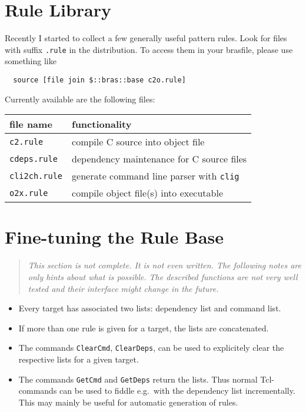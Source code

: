 \documentclass[12pt]{article}
\begin{document}
\section{Rule Library}

Recently I started to collect a few generally useful pattern
rules. Look for files with suffix \texttt{.rule} in the
distribution. To access them in your brasfile, please use something
like 
\begin{verbatim}
  source [file join $::bras::base c2o.rule]
\end{verbatim}
Currently available are the following files:
\begin{center}
\begin{tabular}{l|l}
file name & functionality\\\hline
\texttt{c2.rule} & compile C source into object file\\
\texttt{cdeps.rule} & dependency maintenance for C source files\\
\texttt{cli2ch.rule} & generate command line parser with
  \texttt{clig}\\
\texttt{o2x.rule} & compile object file(s) into executable\\
\end{tabular}
\end{center}

\section{Fine-tuning the Rule Base}
\begin{quote}\itshape
This section is not complete. It is not even written. The following
notes are only hints about what is possible. The described functions
are not very well tested and their interface might change in the
future.
\end{quote}

\begin{itemize}
\item
Every target has associated two lists: dependency list and command list.
\item
If more than one rule is given for a target, the lists are
concatenated. 
\item
The commands \texttt{ClearCmd}, \texttt{ClearDeps},
can be used to explicitely clear the respective
lists for a given target.
\item
The commands \texttt{GetCmd} and \texttt{GetDeps}
return the lists. Thus normal Tcl-commands can be
used to fiddle e.g.\ with the dependency list incrementally. This may
mainly be useful for automatic generation of rules.
\end{itemize}
\end{document}
